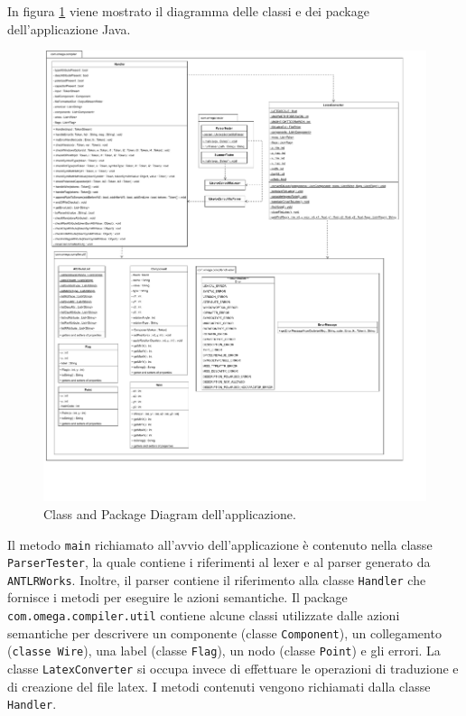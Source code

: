 \noindent
In figura \ref{fig:class_diagram} viene mostrato il diagramma delle classi e dei package dell'applicazione Java.
\begin{figure}[h!]
	\centering
	\includegraphics[width=\textwidth]{./ImageFiles/class and package diagram.pdf}
	\caption{Class and Package Diagram dell'applicazione.}
	\label{fig:class_diagram}
\end{figure}
Il metodo \texttt{main} richiamato all'avvio dell'applicazione è contenuto nella classe \texttt{ParserTester}, la quale contiene i riferimenti al lexer e al parser generato da \texttt{ANTLRWorks}. Inoltre, il parser contiene il riferimento alla classe \texttt{Handler} che fornisce i metodi per eseguire le azioni semantiche. Il package \texttt{com.omega.compiler.util} contiene alcune classi utilizzate dalle azioni semantiche per descrivere un componente (classe \texttt{Component}), un collegamento (\texttt{classe Wire}), una label (classe \texttt{Flag}), un nodo (classe \texttt{Point}) e gli errori. La classe \texttt{LatexConverter} si occupa invece di effettuare le operazioni di traduzione e di creazione del file latex. I metodi contenuti vengono richiamati dalla classe \texttt{Handler}.

